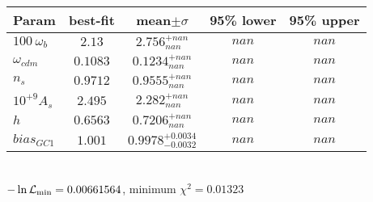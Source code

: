 \begin{tabular}{|l|c|c|c|c|} 
 \hline 
Param & best-fit & mean$\pm\sigma$ & 95\% lower & 95\% upper \\ \hline 
$100~\omega_{b }$ &$2.13$ & $2.756_{nan}^{+nan}$ & $nan$ & $nan$ \\ 
$\omega_{cdm }$ &$0.1083$ & $0.1234_{nan}^{+nan}$ & $nan$ & $nan$ \\ 
$n_{s }$ &$0.9712$ & $0.9555_{nan}^{+nan}$ & $nan$ & $nan$ \\ 
$10^{+9}A_{s }$ &$2.495$ & $2.282_{nan}^{+nan}$ & $nan$ & $nan$ \\ 
$h$ &$0.6563$ & $0.7206_{nan}^{+nan}$ & $nan$ & $nan$ \\ 
$bias_{GC 1 }$ &$1.001$ & $0.9978_{-0.0032}^{+0.0034}$ & $nan$ & $nan$ \\ 
\hline 
 \end{tabular} \\ 
$-\ln{\cal L}_\mathrm{min} =0.00661564$, minimum $\chi^2=0.01323$ \\ 

